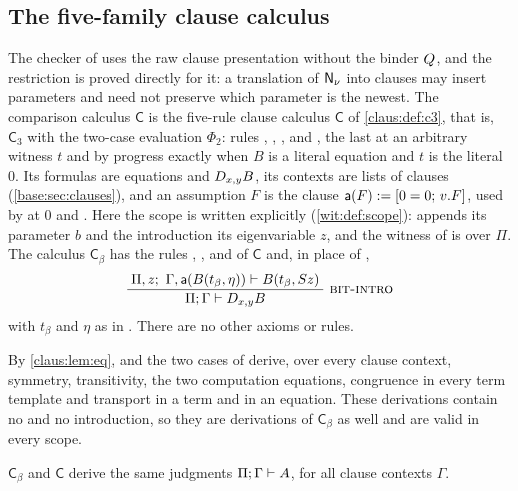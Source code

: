 \subsection{The five-family clause calculus}
\label{wit:sec:clause}

The checker of  uses the raw clause presentation
without the binder $Q_{}$, and the restriction is proved directly for it: a
translation of $\mathsf{N}_{\nu}$ into clauses may insert parameters and need not
preserve which parameter is the newest.  The comparison calculus
$\mathsf{C}$ is the five-rule clause calculus $\mathsf{C}$ of
\cref{claus:def:c3}, that is, $\mathsf{C}_3$ with the two-case evaluation
$\Phi_2$: rules , , ,
 and , the last at an arbitrary witness $t$
and by progress exactly when $B$ is a literal equation and $t$ is the
literal $0$.  Its formulas are equations and $D_{x,y}B$, its contexts are
lists of clauses (\cref{base:sec:clauses}), and an assumption $F$ is the
clause $\mathsf{a}(F)\mathrel{:=}[0=0;\,v.F]$, used by  at $0$
and .  Here the scope is written explicitly
(\cref{wit:def:scope}):  appends its parameter $b$ and the
introduction its eigenvariable $z$, and the witness of  is
over $\Pi$.  The calculus $\mathsf{C}_{\beta}$ has the rules
, ,  and  of
$\mathsf{C}$ and, in place of ,
\[
 \infrule{\Pi,z;\ \Gamma,\mathsf{a}(B(t_\beta,\eta))\proves
          B(t_\beta,\Suc z)}
         {\Pi;\Gamma\proves\D{x}{y}B}\ \rulename{Bit-Intro}
\]
with $t_\beta$ and $\eta$ as in .  There are no other
axioms or rules.

By \cref{claus:lem:eq},  and the two cases of
 derive, over every clause context, symmetry, transitivity,
the two computation equations, congruence in every term template and
transport in a term and in an equation.  These derivations contain no
 and no introduction, so they are derivations of
$\mathsf{C}_{\beta}$ as well and are valid in every scope.

\begin{theorem}
\label{wit:thm:clause-bit}
$\mathsf{C}_{\beta}$ and $\mathsf{C}$ derive the same judgments
$\Pi;\Gamma\vdash A$, for all clause contexts $\Gamma$.
\end{theorem}

